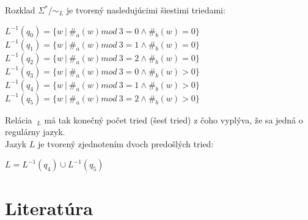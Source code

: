 \documentclass[11pt,a4paper]{article}
\begin{document}
Rozklad $\Sigma^* / \sim_L$ je tvorený nasledujúcimi šiestimi triedami:

\begin{center}
$L^{-1}(q_0) = \{w\ |\ \#_a(w) mod\ 3 = 0 \wedge \#_b(w) = 0\}$\\
$L^{-1}(q_1) = \{w\ |\ \#_a(w) mod\ 3 = 1 \wedge \#_b(w) = 0\}$\\
$L^{-1}(q_2) = \{w\ |\ \#_a(w) mod\ 3 = 2 \wedge \#_b(w) = 0\}$\\
$L^{-1}(q_3) = \{w\ |\ \#_a(w) mod\ 3 = 0 \wedge \#_b(w) > 0\}$\\
$L^{-1}(q_4) = \{w\ |\ \#_a(w) mod\ 3 = 1 \wedge \#_b(w) > 0\}$\\
$L^{-1}(q_5) = \{w\ |\ \#_a(w) mod\ 3 = 2 \wedge \#_b(w) > 0\}$\\
\end{center}

Relácia $~_L$ má tak konečný počet tried (šesť tried) z čoho vyplýva, že sa jedná o regulárny jazyk.\\

Jazyk $L$ je tvorený zjednotením dvoch predošlých tried:

\begin{center}
$L = L^{-1}(q_4) \cup L^{-1}(q_5)$\\
\end{center}

\newpage
\section{Literatúra}

\begin{flushleft}
    
\end{flushleft}
\end{document}
